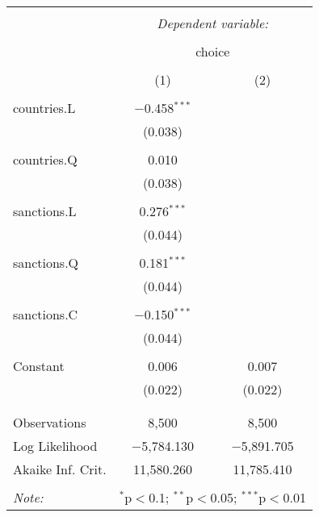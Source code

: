 
\begin{table}[!htbp] \centering 
  \caption{} 
  \label{tab:null:anova} 
\begin{tabular}{@{\extracolsep{5pt}}lcc} 
\\[-1.8ex]\hline 
\hline \\[-1.8ex] 
 & \multicolumn{2}{c}{\textit{Dependent variable:}} \\ 
\cline{2-3} 
\\[-1.8ex] & \multicolumn{2}{c}{choice} \\ 
\\[-1.8ex] & (1) & (2)\\ 
\hline \\[-1.8ex] 
 countries.L & $-$0.458$^{***}$ &  \\ 
  & (0.038) &  \\ 
  & & \\ 
 countries.Q & 0.010 &  \\ 
  & (0.038) &  \\ 
  & & \\ 
 sanctions.L & 0.276$^{***}$ &  \\ 
  & (0.044) &  \\ 
  & & \\ 
 sanctions.Q & 0.181$^{***}$ &  \\ 
  & (0.044) &  \\ 
  & & \\ 
 sanctions.C & $-$0.150$^{***}$ &  \\ 
  & (0.044) &  \\ 
  & & \\ 
 Constant & 0.006 & 0.007 \\ 
  & (0.022) & (0.022) \\ 
  & & \\ 
\hline \\[-1.8ex] 
Observations & 8,500 & 8,500 \\ 
Log Likelihood & $-$5,784.130 & $-$5,891.705 \\ 
Akaike Inf. Crit. & 11,580.260 & 11,785.410 \\ 
\hline 
\hline \\[-1.8ex] 
\textit{Note:}  & \multicolumn{2}{r}{$^{*}$p$<$0.1; $^{**}$p$<$0.05; $^{***}$p$<$0.01} \\ 
\end{tabular} 
\end{table} 


